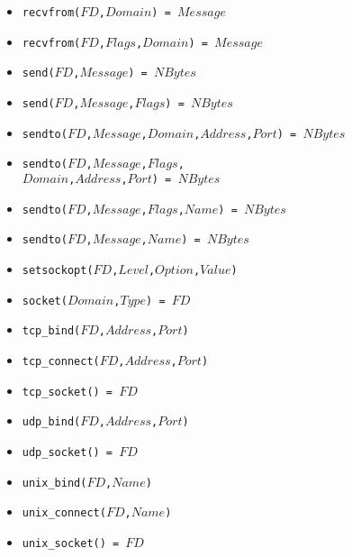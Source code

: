 \documentclass[10pt]{article}
\begin{document}
\begin{multicols}{2}
{\begin{scriptsize}
\begin{itemize}
    \item \texttt{recvfrom($FD$,$Domain$) = $Message$}
    \item \texttt{recvfrom($FD$,$Flags$,$Domain$) = $Message$}
    \item \texttt{send($FD$,$Message$) = $NBytes$}
    \item \texttt{send($FD$,$Message$,$Flags$) = $NBytes$}
    \item \texttt{sendto($FD$,$Message$,$Domain$,$Address$,$Port$) = $NBytes$}
    \item \texttt{sendto($FD$,$Message$,$Flags$, \\        $Domain$,$Address$,$Port$) = $NBytes$}
    \item \texttt{sendto($FD$,$Message$,$Flags$,$Name$) = $NBytes$}
    \item \texttt{sendto($FD$,$Message$,$Name$) = $NBytes$}
    \item \texttt{setsockopt($FD$,$Level$,$Option$,$Value$)}
    \item \texttt{socket($Domain$,$Type$) = $FD$}
    \item \texttt{tcp\_bind($FD$,$Address$,$Port$)}
    \item \texttt{tcp\_connect($FD$,$Address$,$Port$)}
    \item \texttt{tcp\_socket() = $FD$}
    \item \texttt{udp\_bind($FD$,$Address$,$Port$)}
    \item \texttt{udp\_socket() = $FD$}
    \item \texttt{unix\_bind($FD$,$Name$)}
    \item \texttt{unix\_connect($FD$,$Name$)}
    \item \texttt{unix\_socket() = $FD$}
\end{itemize}
\end{scriptsize}
}

\end{multicols}
\end{document}
